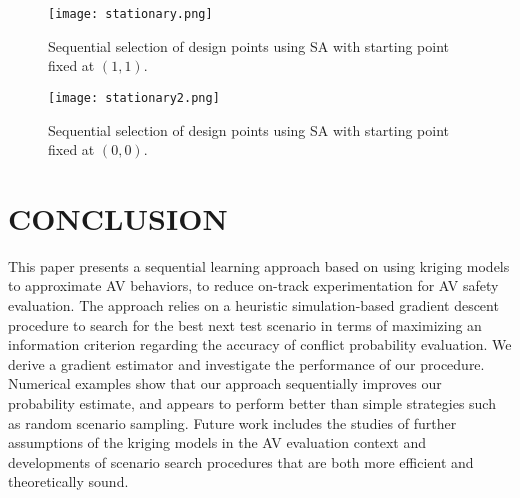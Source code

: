 \documentclass{wscpaperproc}
\theoremstyle{wsc}
\begin{document}
\begin{figure}[ht]
							\centering
							\begin{minipage}[b]{0.5\textwidth}
								\centering
                                \captionsetup{width=.9\linewidth}
	\texttt{[image: stationary.png]}
	\caption{Sequential selection of design points using SA with starting point fixed at $(1,1)$.}
	\label{fig:stationary1}
							\end{minipage}%
							\begin{minipage}[b]{0.5\textwidth}
								\centering
                                \captionsetup{width=.9\linewidth}
	\texttt{[image: stationary2.png]}
	\caption{Sequential selection of design points using SA with starting point fixed at $(0,0)$.}
	\label{fig:stationary2}
							\end{minipage}
			\end{figure}
            





\section{CONCLUSION} \label{sec:conclusion}

This paper presents a sequential learning approach based on using kriging models to approximate AV behaviors, to reduce on-track experimentation for AV safety evaluation. The approach relies
on a heuristic simulation-based gradient descent procedure to search for the best next test scenario in terms of maximizing an information criterion regarding the accuracy of conflict probability evaluation. We derive a gradient estimator and investigate the performance of our procedure. Numerical examples show that our approach sequentially improves our probability estimate, and appears to perform better than simple strategies such as random scenario sampling. Future work includes the studies of further assumptions of the kriging models in the AV evaluation context and developments of scenario search procedures that are both more efficient and theoretically sound.
\end{document}
